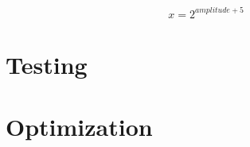 \begin{equation}
  x = 2^{amplitude + 5}
  \label{eq:amplitudCalculation}
\end{equation}

\section{Testing}

\section{Optimization}


